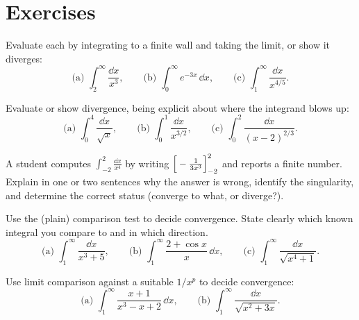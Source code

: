 \chapterline

\section{Exercises}
\label{ch25:exercises}

\begin{exercise}
\label{ch25:exr-eval-first}
Evaluate each by integrating to a finite wall and taking the limit, or show it
diverges:
\[
  \text{(a) } \int_2^{\infty}\frac{\dd x}{x^3},
  \qquad
  \text{(b) } \int_0^{\infty} e^{-3x}\,\dd x,
  \qquad
  \text{(c) } \int_1^{\infty}\frac{\dd x}{x^{4/5}}.
\]
\end{exercise}

\begin{exercise}
\label{ch25:exr-eval-second}
Evaluate or show divergence, being explicit about where the integrand blows up:
\[
  \text{(a) } \int_0^{4}\frac{\dd x}{\sqrt{x}},
  \qquad
  \text{(b) } \int_0^{1}\frac{\dd x}{x^{3/2}},
  \qquad
  \text{(c) } \int_0^{2}\frac{\dd x}{(x-2)^{2/3}}.
\]
\end{exercise}

\begin{exercise}
\label{ch25:exr-hidden}
A student computes $\int_{-2}^{2}\frac{\dd x}{x^4}$ by writing
$\Big[-\frac{1}{3x^3}\Big]_{-2}^{2}$ and reports a finite number. Explain in one or two
sentences why the answer is wrong, identify the singularity, and determine the
correct status (converge to what, or diverge?).
\end{exercise}

\begin{exercise}
\label{ch25:exr-comparison}
Use the (plain) comparison test to decide convergence. State clearly which known
integral you compare to and in which direction.
\[
  \text{(a) } \int_1^{\infty}\frac{\dd x}{x^3 + 5},
  \qquad
  \text{(b) } \int_1^{\infty}\frac{2 + \cos x}{x}\,\dd x,
  \qquad
  \text{(c) } \int_1^{\infty}\frac{\dd x}{\sqrt{x^4 + 1}}.
\]
\end{exercise}

\begin{exercise}
\label{ch25:exr-limit-comparison}
Use limit comparison against a suitable $1/x^p$ to decide convergence:
\[
  \text{(a) } \int_1^{\infty}\frac{x + 1}{x^3 - x + 2}\,\dd x,
  \qquad
  \text{(b) } \int_1^{\infty}\frac{\dd x}{\sqrt{x^2 + 3x}}.
\]
\end{exercise}

